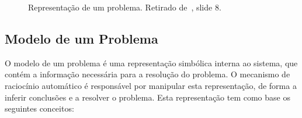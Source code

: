 \begin{figure}[H]
    \begin{center}
    \end{center}
    \caption{Representação de um problema.
    Retirado de~\cite{isel:iasa:slides:racicionio-automatico}, slide 8.}
    \label{fig:representacao-problema}
\end{figure}

\subsection{Modelo de um Problema}\label{subsec:modelo-problema}

O modelo de um problema é uma representação simbólica interna ao sistema, que contém a informação necessária para a resolução do problema.
O mecanismo de raciocínio automático é responsável por manipular esta representação, de forma a inferir conclusões e a resolver o problema. Esta representação tem como base os seguintes conceitos:

